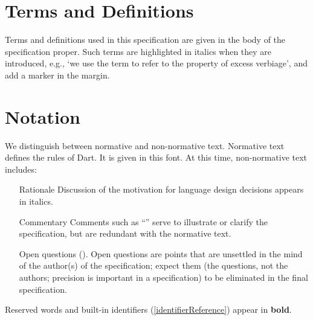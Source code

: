 \documentclass[makeidx]{article}
\begin{document}
\section{Terms and Definitions}

\LMHash{}%
Terms and definitions used in this specification are given in the body of the specification proper.
Such terms are highlighted in italics when they are introduced, e.g., `we use the term  to refer to the property of excess verbiage',
and add a marker in the margin.


\section{Notation}

\LMHash{}%
We distinguish between normative and non-normative text.
Normative text defines the rules of Dart.
It is given in this font.
At this time, non-normative text includes:
\begin{itemize}
\item[Rationale]
  Discussion of the motivation for language design decisions appears in italics.
\item[Commentary]
  Comments such as ``'' serve to illustrate or clarify the specification, but are redundant with the normative text.
\item[Open questions] ().
Open questions are points that are unsettled in the mind of the author(s) of the specification; expect them (the questions, not the authors; precision is important in a specification) to be eliminated in the final specification.
\end{itemize}

\LMHash{}%
Reserved words and built-in identifiers (\ref{identifierReference}) appear in {\bf bold}.

\end{document}
